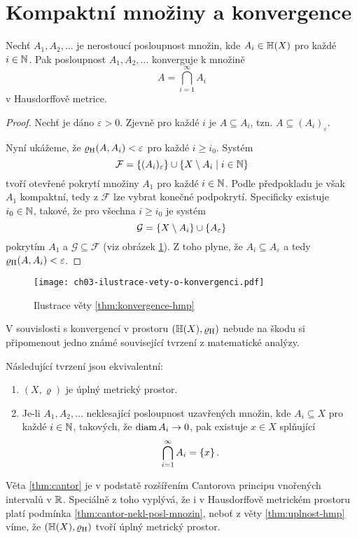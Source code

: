 \section{Kompaktní množiny a konvergence}\label{sec:konvergence-hmp}

\begin{theorem}\label{thm:konvergence-hmp}
    Nechť $A_1,A_2,\ldots$ je nerostoucí posloupnost množin, kde $A_i\in\mathbb{H}(X)$ pro každé $i\in\mathbb{N}$. Pak posloupnost $A_1,A_2,\ldots$ konverguje k množině
    \[A=\bigcap_{i=1}^\infty A_i\]
    v Hausdorffově metrice.
\end{theorem}
\begin{proof}
    Nechť je dáno $\varepsilon>0$. Zjevně pro každé $i$ je $A\subseteq A_i$, tzn. $A\subseteq(A_i)_\varepsilon$.
    
    Nyní ukážeme, že $\varrho_\textup{H}(A,A_i)<\varepsilon$ pro každé $i\geqslant i_0$. Systém
    \[\mathcal{F}=\left\{(A_i)_\varepsilon\right\}\cup\left\{X\setminus A_i\mid i\in\mathbb{N}\right\}\]
    tvoří otevřené pokrytí množiny $A_1$ pro každé $i\in\mathbb{N}$. Podle předpokladu je však $A_1$ kompaktní, tedy z $\mathcal{F}$ lze vybrat konečné podpokrytí. Specificky existuje $i_0\in\mathbb{N}$, takové, že pro všechna $i\geqslant i_0$ je systém
    \[\mathcal{G}=\left\{X\setminus A_i\right\}\cup\left\{A_\varepsilon\right\}\]
    pokrytím $A_1$ a $\mathcal{G}\subseteq\mathcal{F}$ (viz obrázek \ref{fig:konvergence-hmp}). Z toho plyne, že $A_i\subseteq A_\varepsilon$ a tedy $\varrho_\textup{H}(A,A_i)<\varepsilon$.
\end{proof}
\begin{figure}[h]
    \centering
    \texttt{[image: ch03-ilustrace-vety-o-konvergenci.pdf]}
    \caption{Ilustrace věty \ref{thm:konvergence-hmp}}
    \label{fig:konvergence-hmp}
\end{figure}

V souvislosti s konvergencí v prostoru $(\mathbb{H}(X),\varrho_\textup{H})$ nebude na škodu si připomenout jedno známé související tvrzení z matematické analýzy.
\begin{theorem}[Cantorova]\label{thm:cantor}
    Následující tvrzení jsou ekvivalentní:
    \begin{enumerate}[label=(\roman*)]
        \item\label{thm:cantor-uplnost} $(X,\varrho)$ je úplný metrický prostor.
        \item\label{thm:cantor-nekl-posl-mnozin} Je-li $A_1,A_2,\ldots$ neklesající posloupnost uzavřených množin, kde $A_i\subseteq X$ pro každé $i\in\mathbb{N}$, takových, že $\operatorname{diam}{A_i}\to 0$, pak existuje $x\in X$ splňující
        \[\bigcap_{i=1}^\infty A_i=\left\{x\right\}.\]
    \end{enumerate}
\end{theorem}
Věta \ref{thm:cantor} je v podstatě rozšířením Cantorova principu vnořených intervalů v $\mathbb{R}$. Speciálně z toho vyplývá, že i v Hausdorffově metrickém prostoru platí podmínka \ref{thm:cantor-nekl-posl-mnozin}, neboť z věty \ref{thm:uplnost-hmp} víme, že $(\mathbb{H}(X),\varrho_\textup{H})$ tvoří úplný metrický prostor.